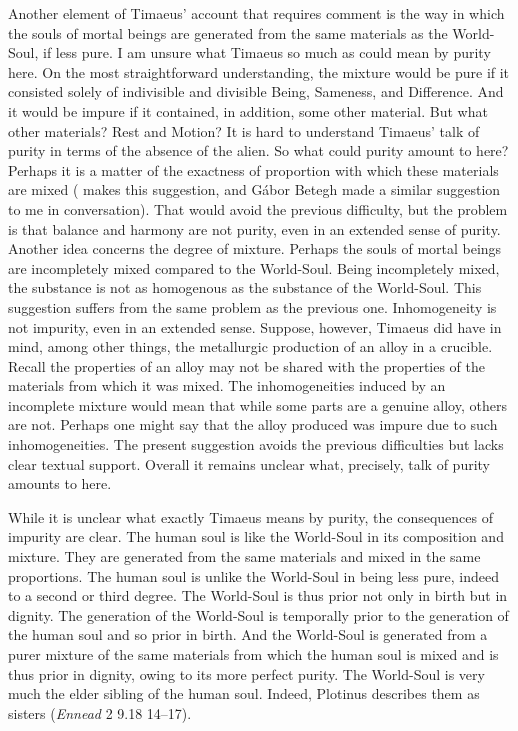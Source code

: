 Another element of Timaeus' account that requires comment is the way in which the souls of mortal beings are generated from the same materials as the World-Soul, if less pure. I am unsure what Timaeus so much as could mean by purity here. On the most straightforward understanding, the mixture would be pure if it consisted solely of indivisible and divisible Being, Sameness, and Difference. And it would be impure if it contained, in addition, some other material. But what other materials? Rest and Motion? It is hard to understand Timaeus' talk of purity in terms of the absence of the alien. So what could purity amount to here? Perhaps it is a matter of the exactness of proportion with which these materials are mixed (\citealt[141 n11]{Archer-Hind:1888qd} makes this suggestion, and Gábor Betegh made a similar suggestion to me in conversation). That would avoid the previous difficulty, but the problem is that balance and harmony are not purity, even in an extended sense of purity. Another idea concerns the degree of mixture. Perhaps the souls of mortal beings are incompletely mixed compared to the World-Soul. Being incompletely mixed, the substance is not as homogenous as the substance of the World-Soul. This suggestion suffers from the same problem as the previous one. Inhomogeneity is not impurity, even in an extended sense. Suppose, however, Timaeus did have in mind, among other things, the metallurgic production of an alloy in a crucible. Recall the properties of an alloy may not be shared with the properties of the materials from which it was mixed. The inhomogeneities induced by an incomplete mixture would mean that while some parts are a genuine alloy, others are not. Perhaps one might say that the alloy produced was impure due to such inhomogeneities. The present suggestion avoids the previous difficulties but lacks clear textual support. Overall it remains unclear what, precisely, talk of purity amounts to here.

While it is unclear what exactly Timaeus means by purity, the consequences of impurity are clear. The human soul is like the World-Soul in its composition and mixture. They are generated from the same materials and mixed in the same proportions. The human soul is unlike the World-Soul in being less pure, indeed to a second or third degree. The World-Soul is thus prior not only in birth but in dignity. The generation of the World-Soul is temporally prior to the generation of the human soul and so prior in birth. And the World-Soul is generated from a purer mixture of the same materials from which the human soul is mixed and is thus prior in dignity, owing to its more perfect purity. The World-Soul is very much the elder sibling of the human soul. Indeed, Plotinus describes them as sisters (\emph{Ennead} 2 9.18 14--17). 


